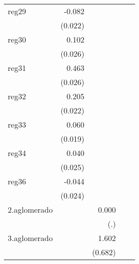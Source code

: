{\begin{longtable}{l*{4}{D{.}{.}{-1}}}
\addlinespace
reg29       &      -0.082\sym{***}&                     &                     &                     \\
            &     (0.022)         &                     &                     &                     \\
\addlinespace
reg30       &       0.102\sym{***}&                     &                     &                     \\
            &     (0.026)         &                     &                     &                     \\
\addlinespace
reg31       &       0.463\sym{***}&                     &                     &                     \\
            &     (0.026)         &                     &                     &                     \\
\addlinespace
reg32       &       0.205\sym{***}&                     &                     &                     \\
            &     (0.022)         &                     &                     &                     \\
\addlinespace
reg33       &       0.060\sym{**} &                     &                     &                     \\
            &     (0.019)         &                     &                     &                     \\
\addlinespace
reg34       &       0.040         &                     &                     &                     \\
            &     (0.025)         &                     &                     &                     \\
\addlinespace
reg36       &      -0.044         &                     &                     &                     \\
            &     (0.024)         &                     &                     &                     \\
\addlinespace
2.aglomerado&                     &       0.000         &                     &                     \\
            &                     &         (.)         &                     &                     \\
\addlinespace
3.aglomerado&                     &       1.602\sym{*}  &                     &                     \\
            &                     &     (0.682)         &                     &                     \\

\end{longtable}}
